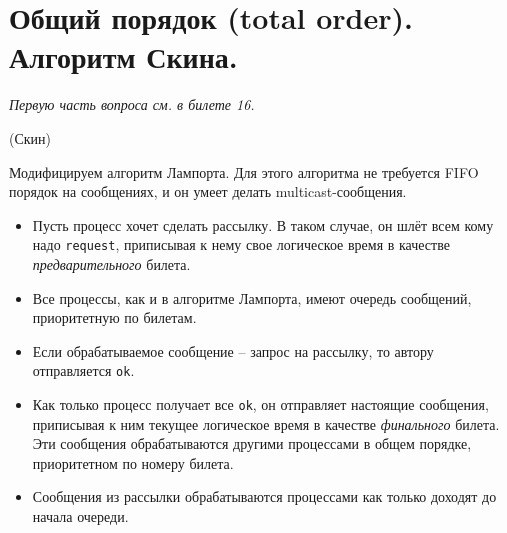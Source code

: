 \section{Общий порядок (total order). Алгоритм Скина.}

\textit{Первую часть вопроса см. в билете 16.}

\begin{algorithm}(Скин)
    
    Модифицируем алгоритм Лампорта. Для этого алгоритма не требуется FIFO порядок 
    на сообщениях, и он умеет делать multicast-сообщения.
    \begin{itemize}
        \item Пусть процесс хочет сделать рассылку. В таком случае, он
            шлёт всем кому надо \texttt{request}, приписывая к нему свое
            логическое время в качестве \textit{предварительного} билета.
        \item Все процессы, как и в алгоритме Лампорта, имеют очередь сообщений,
            приоритетную по билетам.
        \item Если обрабатываемое сообщение -- запрос на рассылку, то автору 
            отправляется \texttt{ok}.
        \item Как только процесс получает все \texttt{ok}, он отправляет настоящие
            сообщения, приписывая к ним текущее логическое время в качестве
            \textit{финального} билета. Эти сообщения обрабатываются другими 
            процессами в общем порядке, приоритетном по номеру билета.
        \item Сообщения из рассылки обрабатываются процессами как только доходят
            до начала очереди.
    \end{itemize}
\end{algorithm}
